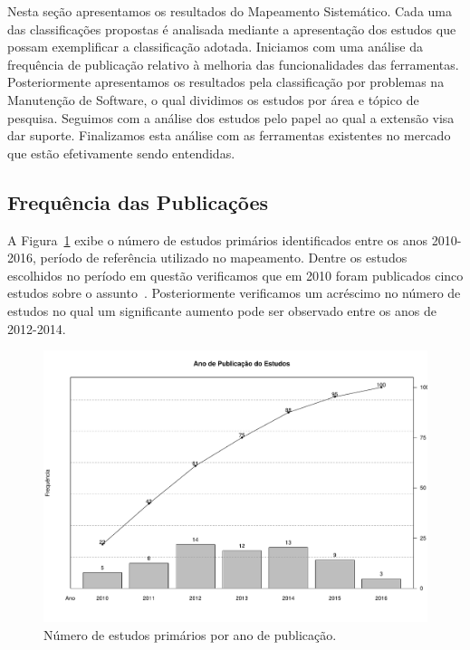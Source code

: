 Nesta seção apresentamos os resultados do Mapeamento Sistemático. Cada uma das
classificações propostas é analisada mediante a apresentação dos estudos que
possam exemplificar a classificação adotada.  Iniciamos com uma análise da
frequência de publicação relativo à melhoria das funcionalidades das
ferramentas.  Posteriormente apresentamos os resultados pela classificação por
problemas na Manutenção de Software, o qual dividimos os estudos por área e
tópico de pesquisa. Seguimos com a análise dos estudos pelo papel ao qual a
extensão visa dar suporte. Finalizamos esta análise com as ferramentas
existentes no mercado que estão efetivamente sendo entendidas.

\subsection{Frequência das Publicações}
\label{sub:frequencia_publicacao}

A Figura~\ref{fig:publicacao_por_ano} exibe o número de estudos primários
identificados entre os anos 2010\@-\@2016, período de referência utilizado no
mapeamento. Dentre os estudos escolhidos no período em questão verificamos que
em 2010 foram publicados cinco estudos sobre o
assunto~\cite{sun2010discriminative,gegick2010identifying,song2010jdf,nagwani2010predictive,zimmermann2010makes}.
Posteriormente verificamos um acréscimo no número de estudos no qual um
significante aumento pode ser observado entre os anos de 2012\@-\@2014.

\begin{figure}[htpb] \centering
	\includegraphics[width=0.9\linewidth]{chapter-mapeamento-sistematico/img/ano-publicao-estudos.pdf}
	\caption{Número de estudos primários por ano de publicação.}
\label{fig:publicacao_por_ano} \end{figure}

